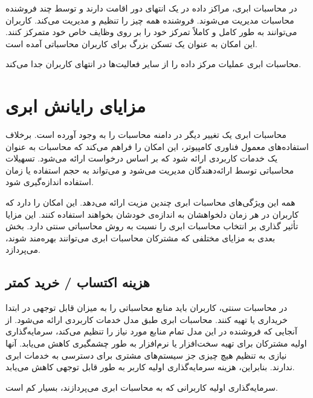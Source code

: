 \documentclass{book}
\begin{document}
            در محاسبات ابری، مراکز داده در یک انتهای دور اقامت دارند و توسط چند فروشنده محاسبات مدیریت می‌شوند. فروشنده همه چیز را تنظیم و مدیریت می‌کند. کاربران می‌توانند به طور کامل و کاملاً تمرکز خود را بر روی وظایف خاص خود متمرکز کنند. این امکان به عنوان یک تسکن بزرگ برای کاربران محاسباتی آمده است.

            \begin{addinfo}
                
                محاسبات ابری عملیات مرکز داده را از سایر فعالیت‌ها در انتهای کاربران جدا می‌کند.

            \end{addinfo}

        \section{مزایای رایانش ابری}

            محاسبات ابری یک تغییر دیگر در دامنه محاسبات را به وجود آورده است. برخلاف استفاده‌های معمول فناوری کامپیوتر، این امکان را فراهم می‌کند که محاسبات به عنوان یک خدمات کاربردی ارائه شود که بر اساس درخواست ارائه می‌شود. تسهیلات محاسباتی توسط ارائه‌دهندگان مدیریت می‌شود و می‌تواند به حجم استفاده یا زمان استفاده اندازه‌گیری شود.

            همه این ویژگی‌های محاسبات ابری چندین مزیت ارائه می‌دهد. این امکان را دارد که کاربران در هر زمان دلخواهشان به اندازه‌ی خودشان بخواهند استفاده کنند. این مزایا تأثیر گذاری بر انتخاب محاسبات ابری را نسبت به روش محاسباتی سنتی دارد. بخش بعدی به مزایای مختلفی که مشترکان محاسبات ابری می‌توانند بهره‌مند شوند، می‌پردازد.

            \subsection{هزینه اکتساب / خرید کمتر}

                در محاسبات سنتی، کاربران باید منابع محاسباتی را به میزان قابل توجهی در ابتدا خریداری یا تهیه کنند. محاسبات ابری طبق مدل خدمات کاربردی ارائه می‌شود. از آنجایی که فروشنده در این مدل تمام منابع مورد نیاز را تنظیم می‌کند، سرمایه‌گذاری اولیه مشترکان برای تهیه سخت‌افزار یا نرم‌افزار به طور چشمگیری کاهش می‌یابد. آنها نیازی به تنظیم هیچ چیزی جز سیستم‌های مشتری برای دسترسی به خدمات ابری ندارند. بنابراین، هزینه سرمایه‌گذاری اولیه کاربر به طور قابل توجهی کاهش می‌یابد.

                \begin{addinfo}
                    
                    سرمایه‌گذاری اولیه کاربرانی که به محاسبات ابری می‌پردازند، بسیار کم است.

                \end{addinfo}
\end{document}

